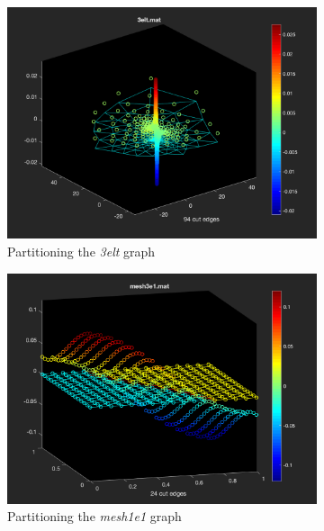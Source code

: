 \documentclass[unicode,11pt,a4paper,oneside,numbers=endperiod,openany]{scrartcl}
\begin{document}
\begin{enumerate}
	\begin{figure}[h!]
		\centering
		\begin{subfigure}[b]{0.45\textwidth}
		\includegraphics[width=\textwidth]{images/3elt_3d.png}
		\caption{Partitioning the \textit{3elt} graph}
		\end{subfigure}
		\hfill
		\begin{subfigure}[b]{0.455\textwidth}
		\includegraphics[width=\textwidth]{images/mesh1e1_3d.png}
		\caption{Partitioning the \textit{mesh1e1} graph}
		\end{subfigure}
		\vfill
		\begin{subfigure}[b]{0.45\textwidth}

\end{subfigure}
\end{figure}
\end{enumerate}
\end{document}
